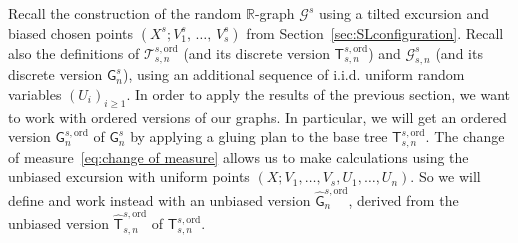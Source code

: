 \documentclass[AHL,Unicode,longabstracts,published]{cedram}
\newcommand{\ord}{\mathrm{ord}}
\newcommand{\cG}{\mathcal{G}}
\newcommand{\cT}{\mathcal{T}}
\newcommand{\sG}{\mathsf{G}}
\newcommand{\sT}{\mathsf{T}}
\newcommand{\R}{\mathbb{R}}
\newcommand{\R}{\mathbb{R}}
\begin{document}
Recall the construction of the random $\R$-graph $\cG^{s}$ using a tilted excursion and biased chosen points $(X^s;V_1^s,\,\dots,\,V_s^s)$ from Section~\ref{sec:SLconfiguration}. Recall also the definitions of $\cT_{s,n}^{s,\ord}$ (and its discrete version $\sT_{s,n}^{s,\ord}$) and $\cG_{s,n}^s$ (and its discrete version $\sG_{n}^{s}$), using an additional sequence of i.i.d. uniform random variables $(U_i)_{i\geq 1}$. In order to apply the results of the previous section, we want to work with ordered versions of our graphs. In particular, we will get an ordered version $\sG_n^{s,\ord}$ of $\sG_n^s$ by applying a gluing plan to the base tree $\sT_{s,n}^{s,\ord}$. The change of measure~\eqref{eq:change of measure} allows us to make calculations using the unbiased excursion with uniform points $(X;V_1,\dots,V_s, U_1, \ldots, U_n)$. So we will define and work instead with an unbiased version $\widehat{\sG}_{n}^{s,\ord}$, derived from the unbiased version $\widehat{\sT}_{s,n}^{s,\ord}$ of $\sT_{s,n}^{s,\ord}$.
\end{document}
